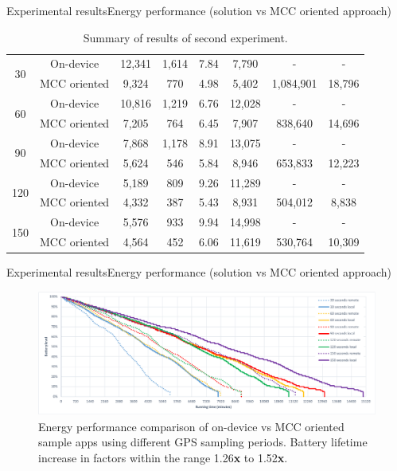 \documentclass[8pt,xcolor={dvipsnames},handout]{beamer}
\begin{document}
\begin{frame}{Experimental results}{Energy performance (solution vs MCC oriented approach)}
\begin{table}
{\begin{tabular}{@{}cccccccc@{}}
\multirow{2}{*}{30}  & On-device   &  12,341 & 1,614 & 7.84  & 7,790 & - & - \\
                          & MCC oriented &  9,324 &   770 & 4.98  & 5,402 & 1,084,901 & 18,796 \\
\cmidrule(l){2-8}
\multirow{2}{*}{60}  & On-device    & 10,816 & 1,219 & 6.76 & 12,028 & - & - \\
                          & MCC oriented &  7,205 &   764 & 6.45 &  7,907 & 838,640 & 14,696 \\
\cmidrule(l){2-8}
\multirow{2}{*}{90}  & On-device    & 7,868 & 1,178 & 8.91 & 13,075 & - & - \\
                          & MCC oriented & 5,624 &   546 & 5.84 &  8,946 & 653,833 & 12,223 \\
\cmidrule(l){2-8}
\multirow{2}{*}{120} & On-device    & 5,189 & 809 & 9.26 & 11,289 & - & - \\
                          & MCC oriented & 4,332 & 387 & 5.43 &  8,931 & 504,012 & 8,838 \\
\cmidrule(l){2-8}
\multirow{2}{*}{150} & On-device    & 5,576 & 933 & 9.94 & 14,998 & - & - \\
                          & MCC oriented & 4,564 & 452 & 6.06 & 11,619 & 530,764 & 10,309 \\
\bottomrule
\end{tabular}%
}
\caption{Summary of results of second experiment.}
\label{tbl:experiment-2}
\end{table}
\end{frame}

\begin{frame}{Experimental results}{Energy performance (solution vs MCC oriented approach)}
\begin{figure}
  \centering
  \includegraphics[width=\columnwidth]{vectors/plot-energy-performance-r2}
  \caption{Energy performance comparison of on-device vs MCC oriented sample apps using different GPS sampling periods. Battery lifetime increase in factors within the range 1.26\textbf{x} to 1.52\textbf{x}.}
  \label{fig:plot-energy-performance}
\end{figure}
\end{frame}
\end{document}
